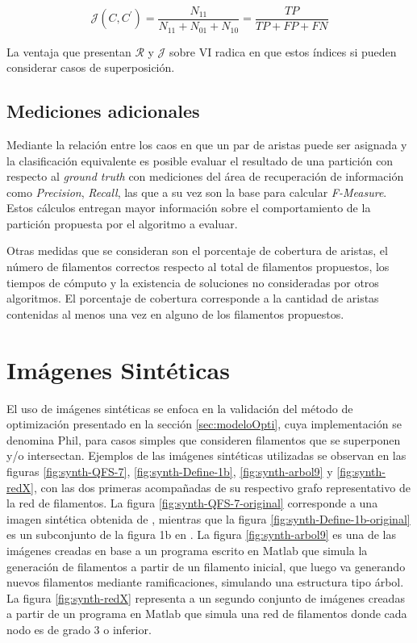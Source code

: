 \begin{equation}
\mathcal{J}(C,C^{\prime}) = \frac{N_{11}}{N_{11} + N_{01} + N_{10}} = \frac{TP}{TP + FP + FN}
\label{eq:JaccardIndex}
\end{equation}

La ventaja que presentan $\mathcal{R}$ y $\mathcal{J}$ sobre VI radica en que estos \'indices si pueden considerar casos de superposici\'on.

\subsection{Mediciones adicionales}

Mediante la relaci\'on entre los caos en que un par de aristas puede ser asignada y la clasificaci\'on equivalente es posible evaluar el resultado de una partici\'on con respecto al {\it ground truth} con mediciones del \'area de recuperaci\'on de informaci\'on como {\it Precision}, {\it Recall}, las que a su vez son la base para calcular {\it F-Measure}.
Estos c\'alculos entregan mayor informaci\'on sobre el comportamiento de la partici\'on propuesta por el algoritmo a evaluar. 


Otras medidas que se consideran son el porcentaje de cobertura de aristas, el n\'umero de filamentos correctos respecto al total de filamentos propuestos, los tiempos de c\'omputo y la existencia de soluciones no consideradas por otros algoritmos. El porcentaje de cobertura corresponde a la cantidad de aristas contenidas al menos una vez en alguno de los filamentos propuestos.

\section{Im\'agenes Sint\'eticas}

El uso de im\'agenes sint\'eticas se enfoca en la validaci\'on del m\'etodo de optimizaci\'on presentado en la secci\'on \ref{sec:modeloOpti}, cuya implementaci\'on se denomina {\sc Phil}, para casos simples que consideren filamentos que se superponen y/o intersectan. Ejemplos de las im\'agenes sint\'eticas utilizadas se observan en las figuras \ref{fig:synth-QFS-7}, \ref{fig:synth-Define-1b}, \ref{fig:synth-arbol9} y \ref{fig:synth-redX}, con las dos primeras acompa\~nadas de su respectivo grafo representativo de la red de filamentos. La figura \ref{fig:synth-QFS-7-original} corresponde a una imagen sint\'etica obtenida de \cite{qiu2014quantitative}, mientras que la figura \ref{fig:synth-Define-1b-original} es un subconjunto de la figura 1b  en \cite{breuer2015define}. La figura \ref{fig:synth-arbol9} es una de las im\'agenes creadas en base a un programa escrito en Matlab que simula la generaci\'on de filamentos a partir de un filamento inicial, que luego va generando nuevos filamentos mediante ramificaciones, simulando una estructura tipo \'arbol. La figura \ref{fig:synth-redX} representa a un segundo conjunto de im\'agenes creadas a partir de un programa en Matlab que simula una red de filamentos donde cada nodo es de grado 3 o inferior.

